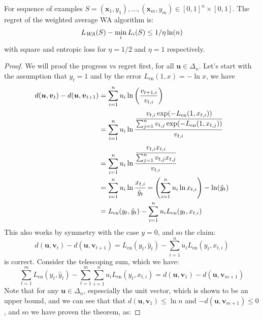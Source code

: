 \begin{theorem}
    For sequence of examples $S = (\boldsymbol x_1, y_1),\dots,(\boldsymbol x_m, y_m) \in [0, 1]^n \times [0, 1]$. The regret of the weighted average WA algorithm is:
    \begin{equation*}
        L_\text{\emph{WA}}(S) - \min_i L_i(S) \le 1/\eta \ln(n)
    \end{equation*}
    with square and entropic loss for $\eta=1/2$ and $\eta=1$ respectively. 
\end{theorem}
\begin{proof}
    We will proof the progress vs regret first, for all $\boldsymbol u \in \Delta_n$. Let's start with the assumption that $y_t = 1$ and by the error $L_\text{en}(1, x) = -\ln x$, we have
    \begin{equation*}
    \begin{aligned}
        d(\boldsymbol u, \boldsymbol v_t) - d(\boldsymbol u, \boldsymbol v_{t+1}) &= \sum^n_{i=1}u_i\ln\left( \frac{v_{t+1, i}}{v_{t, i}} \right) \\
        &= \sum^n_{i=1} u_i\ln\cfrac{\cfrac{v_{t, i}\exp(-L_\text{en}(1, x_{t, i})) }{\sum^n_{j=1} v_{t, j}\exp(-L_\text{en}(1, x_{t, j})) }}{v_{t, i}} \\
        &= \sum^n_{i=1} u_i\ln\cfrac{\cfrac{v_{t, i}x_{t, i}}{\sum^n_{j=1} v_{t, j}x_{t, j} }}{v_{t, i}} \\
        &= \sum^n_{i=1} u_i\ln\cfrac{x_{t, i}}{\hat{y}_t} = \left( \sum^n_{i=1}u_i\ln x_{t, i} \right) - \ln(\hat{y}_t) \\
        &= L_\text{en}(y_t, \hat{y}_t) - \sum^n_{i=1}u_iL_\text{en}(y_t, x_{t, i})
    \end{aligned}
    \end{equation*}
    This also works by symmetry with the case $y=0$, and so the claim:
    \begin{equation*}
        d(\boldsymbol u, \boldsymbol v_t) - d(\boldsymbol u, \boldsymbol v_{t+1}) = L_\text{en}(y_t, \hat{y}_t) - \sum^n_{i=1}u_iL_\text{en}(y_t, x_{t, i})
    \end{equation*}
    is correct. Consider the telescoping sum, which we have:
    \begin{equation*}
        \sum^m_{t=1}L_\text{en}(y_t, \hat{y}_t) - \sum^m_{t=1}\sum^n_{i=1}u_iL_\text{en}(y_t, x_{t, i}) = d(\boldsymbol u, \boldsymbol v_1) - d(\boldsymbol u, \boldsymbol v_{m+1})
    \end{equation*}
    Note that for any $\boldsymbol u \in \Delta_n$, espescially the unit vector, which is shown to be an upper bound, and we can see that that $d(\boldsymbol u, \boldsymbol v_1) \le \ln n$ and $-d(\boldsymbol u, \boldsymbol v_{m+1}) \le 0$, and so we have proven the theorem, as:

\end{proof}
